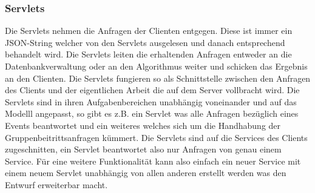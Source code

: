 \begin {center}
\end {center}

	\subsubsection{Servlets}

	Die Servlets nehmen die Anfragen der Clienten entgegen. Diese ist immer ein JSON-String welcher von den Servlets ausgelesen und danach entsprechend behandelt wird. Die Servlets leiten die erhaltenden Anfragen entweder an die Datenbankverwaltung oder an den Algorithmus weiter und schicken das Ergebnis an den Clienten.
Die Servlets fungieren so als Schnittstelle zwischen den Anfragen des Clients und der eigentlichen Arbeit die auf dem Server vollbracht wird. 
Die Servlets sind in ihren Aufgabenbereichen unabhängig voneinander und auf das Modelll angepasst, so gibt es z.B. ein Servlet was alle Anfragen bezüglich eines Events beantwortet und ein weiteres welches sich um die Handhabung der Gruppenbeitrittsanfragen kümmert.
Die Servlets sind auf die Services des Clients zugeschnitten, ein Servlet beantwortet also nur Anfragen von genau einem Service.
Für eine weitere Funktionalität kann also einfach ein neuer Service mit einem neuem Servlet unabhängig von allen anderen erstellt werden was den Entwurf erweiterbar macht.   


\begin {center}
\end {center}


